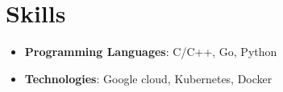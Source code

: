 \documentclass[letterpaper,11pt]{article}
\newcommand{\resumeSubHeadingListStart}{\begin{itemize}[leftmargin=*]}
\newcommand{\resumeSubHeadingListEnd}{\end{itemize}}
\begin{document}
\section{Skills}
  \resumeSubHeadingListStart
    \item{
      \textbf{Programming Languages}{: C/C++, Go, Python }
      \hfill
      }
    \item{
    \textbf{Technologies}{: Google cloud, Kubernetes, Docker}
    }
 \resumeSubHeadingListEnd


\end{document}
